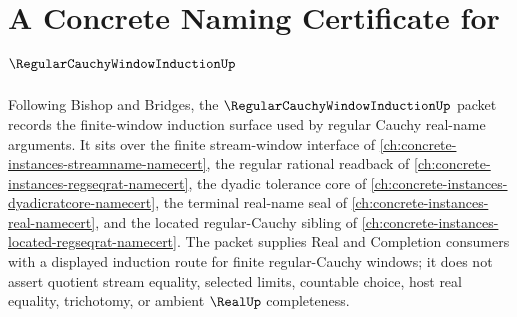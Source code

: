 \chapter{A Concrete Naming Certificate for $\RegularCauchyWindowInductionUp$}
\label{ch:concrete-instances-regular-cauchy-window-induction-namecert}

Following Bishop and Bridges, the $\RegularCauchyWindowInductionUp$ packet records the finite-window induction surface used by regular Cauchy real-name arguments. It sits over the finite stream-window interface of \autoref{ch:concrete-instances-streamname-namecert}, the regular rational readback of \autoref{ch:concrete-instances-regseqrat-namecert}, the dyadic tolerance core of \autoref{ch:concrete-instances-dyadicratcore-namecert}, the terminal real-name seal of \autoref{ch:concrete-instances-real-namecert}, and the located regular-Cauchy sibling of \autoref{ch:concrete-instances-located-regseqrat-namecert}. The packet supplies Real and Completion consumers with a displayed induction route for finite regular-Cauchy windows; it does not assert quotient stream equality, selected limits, countable choice, host real equality, trichotomy, or ambient $\RealUp$ completeness.

